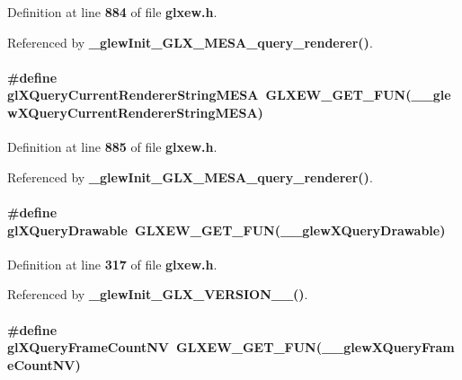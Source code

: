 Definition at line {\bf 884} of file {\bf glxew.\+h}.



Referenced by {\bf \+\_\+glew\+Init\+\_\+\+G\+L\+X\+\_\+\+M\+E\+S\+A\+\_\+query\+\_\+renderer()}.

\paragraph[{gl\+X\+Query\+Current\+Renderer\+String\+M\+E\+SA}]{\setlength{\rightskip}{0pt plus 5cm}\#define gl\+X\+Query\+Current\+Renderer\+String\+M\+E\+SA~{\bf G\+L\+X\+E\+W\+\_\+\+G\+E\+T\+\_\+\+F\+UN}({\bf \+\_\+\+\_\+glew\+X\+Query\+Current\+Renderer\+String\+M\+E\+SA})}\label{glxew_8h_adf4ecabf8cef60674ba18c02f07dc4fa}


Definition at line {\bf 885} of file {\bf glxew.\+h}.



Referenced by {\bf \+\_\+glew\+Init\+\_\+\+G\+L\+X\+\_\+\+M\+E\+S\+A\+\_\+query\+\_\+renderer()}.

\paragraph[{gl\+X\+Query\+Drawable}]{\setlength{\rightskip}{0pt plus 5cm}\#define gl\+X\+Query\+Drawable~{\bf G\+L\+X\+E\+W\+\_\+\+G\+E\+T\+\_\+\+F\+UN}({\bf \+\_\+\+\_\+glew\+X\+Query\+Drawable})}\label{glxew_8h_ac13260a5a2a9b5d0ec3cf107c2684aab}


Definition at line {\bf 317} of file {\bf glxew.\+h}.



Referenced by {\bf \+\_\+glew\+Init\+\_\+\+G\+L\+X\+\_\+\+V\+E\+R\+S\+I\+O\+N\+\_\+\_()}.

\paragraph[{gl\+X\+Query\+Frame\+Count\+NV}]{\setlength{\rightskip}{0pt plus 5cm}\#define gl\+X\+Query\+Frame\+Count\+NV~{\bf G\+L\+X\+E\+W\+\_\+\+G\+E\+T\+\_\+\+F\+UN}({\bf \+\_\+\+\_\+glew\+X\+Query\+Frame\+Count\+NV})}\label{glxew_8h_af1f93d288adb5677b35b77ed68dd1bae}



